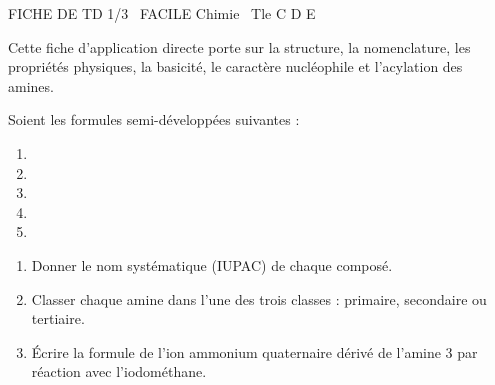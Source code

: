 \documentclass[11pt]{article}
\begin{document}
\begin{tcolorbox}[enhanced,colback=popink,colframe=popink,arc=10pt,boxrule=0pt,left=12pt,right=12pt,top=9pt,bottom=9pt]
{\color{white}\popxbold\small FICHE DE TD 1/3 \textbullet\ FACILE \hfill Chimie \textbullet\ Tle C D E\par}
\end{tcolorbox}
\vspace{4pt}
\noindent Cette fiche d'application directe porte sur la structure, la nomenclature, les propriétés physiques, la basicité, le caractère nucléophile et l'acylation des amines.

\begin{exercice}
Soient les formules semi-développées suivantes :
\begin{enumerate}
    \item {}
    \item {}
    \item {}
    \item {}
    \item {}
\end{enumerate}
\begin{enumerate}
    \item Donner le nom systématique (IUPAC) de chaque composé.
    \item Classer chaque amine dans l'une des trois classes : primaire, secondaire ou tertiaire.
    \item Écrire la formule de l'ion ammonium quaternaire dérivé de l'amine 3 par réaction avec l'iodométhane.
\end{enumerate}
\end{exercice}
\end{document}
